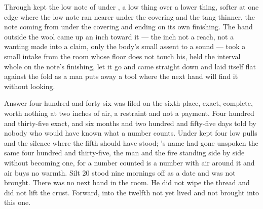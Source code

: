 Through   kept the low note of  under , a low thing over a lower thing, softer at one edge where the low note ran nearer under the covering and the tang thinner, the note coming from under the covering and ending on its own finishing. The hand outside the wool came up an inch toward it — the inch not a reach, not a wanting made into a claim, only the body's small assent to a sound — took a small intake from the room whose floor does not touch his, held the interval whole on the note's finishing, let it go and came straight down and laid itself flat against the fold as a man puts away a tool where the next hand will find it without looking.

Answer four hundred and forty-six was filed on the sixth place, exact, complete, worth nothing at two inches of air, a restraint and not a payment. Four hundred and thirty-five exact, and six months and two hundred and fifty-five days told by nobody who would have known what a number counts. Under   kept four low pulls and the silence where the fifth should have stood; 's name had gone unspoken the same four hundred and thirty-five, the man and the fire standing side by side without becoming one, for a number counted is a number with air around it and air buys no warmth. Silt 20 stood nine mornings off as a date and was not brought. There was no next hand in the room. He did not wipe the thread and did not lift the crust. Forward, into the twelfth not yet lived and not brought into this one.
